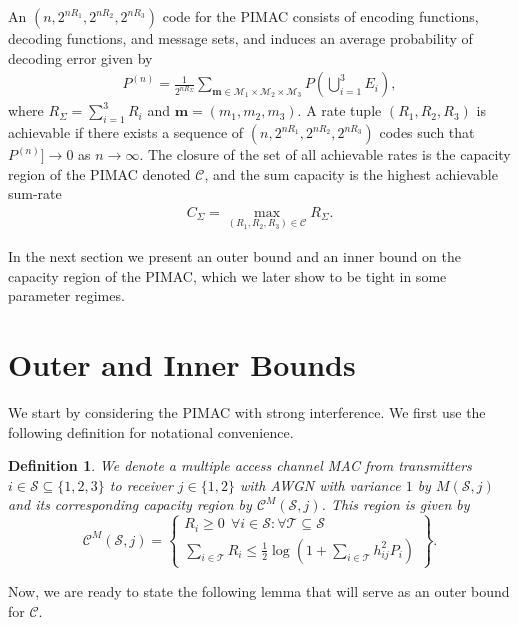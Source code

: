 \documentclass[10pt,conference]{IEEEtran}
\renewcommand{\vec}[1]{\ensuremath{\mathbf{#1}}}
\newtheorem{definition}{Definition}
\begin{document}
An $(n,2^{nR_1},2^{nR_2},2^{nR_3})$ code for the PIMAC consists of encoding functions, decoding functions, and message sets, and induces an average probability of decoding error given by 
\begin{align}
P^{(n)}=\frac{1}{2^{nR_\Sigma}}\sum_{\vec{m}\in\mathcal{M}_1\times\mathcal{M}_2\times\mathcal{M}_3}P\left(\bigcup_{i=1}^3E_i\right),
\end{align}
where $R_\Sigma=\sum_{i=1}^3R_i$ and $\vec{m}=(m_1,m_2,m_3)$. A rate tuple $(R_1,R_2,R_3)$ is achievable if there exists a sequence of $(n,2^{nR_1},2^{nR_2},2^{nR_3})$ codes such that $P^{(n)}]\to0$ as $n\to\infty$. The closure of the set of all achievable rates is the capacity region of the PIMAC denoted $\mathcal{C}$, and the sum capacity is the highest achievable sum-rate 
\begin{align}
C_\Sigma=\max_{(R_1,R_2,R_3)\in\mathcal{C}}R_\Sigma.
\end{align}

In the next section we present an outer bound and an inner bound on the capacity region of the PIMAC, which we later show to be tight in some parameter regimes.




\section{Outer and Inner Bounds}
\label{Bounds}

We start by considering the PIMAC with strong interference. We first use the following definition for notational convenience.
\begin{definition}
We denote a multiple access channel MAC from transmitters $i\in\mathcal{S}\subseteq\{1,2,3\}$ to receiver $j\in\{1,2\}$ with AWGN with variance $1$ by $M(\mathcal{S},j)$ and its corresponding capacity region by $\mathcal{C}^M(\mathcal{S},j)$. This region is given by
\begin{equation*}
\mathcal{C}^M(\mathcal{S},j)=\left\{
\begin{array}{l}
R_i\geq0\ \ \forall i \in \mathcal{S}: \forall \mathcal{T}\subseteq\mathcal{S}\\
\sum_{i\in\mathcal{T}}R_i\leq\frac{1}{2}\log\left(1+\sum_{i\in\mathcal{T}}h_{ij}^2P_i\right)
\end{array}
\right\}.
\end{equation*}
\end{definition}
Now, we are ready to state the following lemma that will serve as an outer bound for $\mathcal{C}$.
\end{document}
